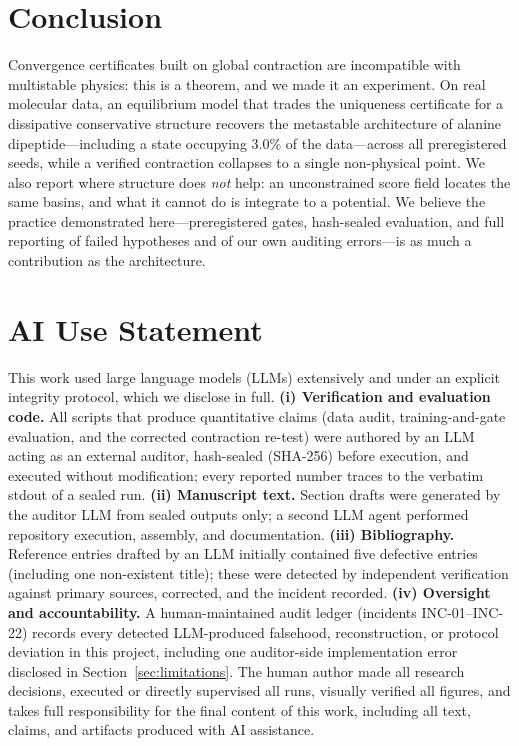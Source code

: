 \section{Conclusion}
\label{sec:conclusion}
Convergence certificates built on global contraction are incompatible with
multistable physics: this is a theorem, and we made it an experiment. On
real molecular data, an equilibrium model that trades the uniqueness
certificate for a dissipative conservative structure recovers the metastable
architecture of alanine dipeptide---including a state occupying 3.0\% of the
data---across all preregistered seeds, while a verified contraction collapses
to a single non-physical point. We also report where structure does
\emph{not} help: an unconstrained score field locates the same basins, and
what it cannot do is integrate to a potential. We believe the practice
demonstrated here---preregistered gates, hash-sealed evaluation, and full
reporting of failed hypotheses and of our own auditing errors---is as much a
contribution as the architecture.

\section*{AI Use Statement}
This work used large language models (LLMs) extensively and under an
explicit integrity protocol, which we disclose in full. \textbf{(i)
Verification and evaluation code.} All scripts that produce quantitative
claims (data audit, training-and-gate evaluation, and the corrected
contraction re-test) were authored by an LLM acting as an external auditor,
hash-sealed (SHA-256) before execution, and executed without modification;
every reported number traces to the verbatim stdout of a sealed run.
\textbf{(ii) Manuscript text.} Section drafts were generated by the auditor
LLM from sealed outputs only; a second LLM agent performed repository
execution, assembly, and documentation. \textbf{(iii) Bibliography.}
Reference entries drafted by an LLM initially contained five defective
entries (including one non-existent title); these were detected by
independent verification against primary sources, corrected, and the
incident recorded. \textbf{(iv) Oversight and accountability.} A
human-maintained audit ledger (incidents INC-01--INC-22) records every
detected LLM-produced falsehood, reconstruction, or protocol deviation in
this project, including one auditor-side implementation error disclosed in
Section~\ref{sec:limitations}. The human author made all research
decisions, executed or directly supervised all runs, visually verified all
figures, and takes full responsibility for the final content of this work,
including all text, claims, and artifacts produced with AI assistance.

